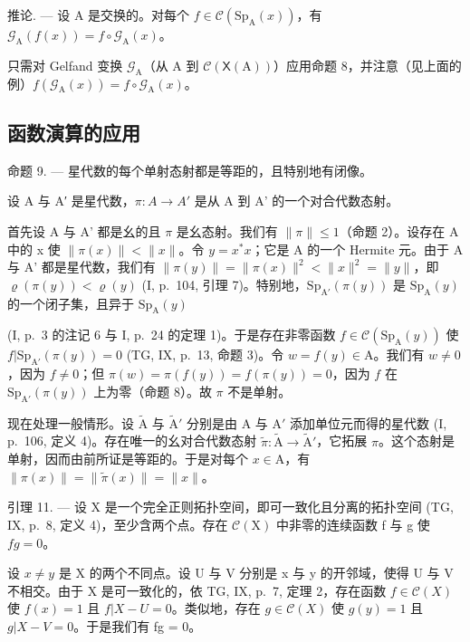 推论. --- 设 A 是交换的。对每个 \(f \in \mathcal{C}(\mathrm{Sp}_{\mathrm{A}}(x))\)，有 \(\mathcal{G}_{\mathrm{A}}(f(x)) = f \circ \mathcal{G}_{\mathrm{A}}(x)\)。

只需对 Gelfand 变换 \(\mathcal{G}_{\mathrm{A}}\)（从 A 到 \(\mathcal{C}(\mathsf{X}(\mathrm{A}))\)）应用命题 8，并注意（见上面的例）\(f(\mathcal{G}_{\mathrm{A}}(x)) = f \circ \mathcal{G}_{\mathrm{A}}(x)\)。

\subsection{函数演算的应用}

命题 9. --- 星代数的每个单射态射都是等距的，且特别地有闭像。

设 A 与 A′ 是星代数，\(\pi\colon A\to A'\) 是从 A 到 A' 的一个对合代数态射。

首先设 A 与 A' 都是幺的且 \(\pi\) 是幺态射。我们有 \(\|\pi\| \leqslant 1\)（命题 2）。设存在 A 中的 x 使 \(\|\pi(x)\| < \|x\|\)。令 \(y = x^{*}x\)；它是 A 的一个 Hermite 元。由于 A 与 A' 都是星代数，我们有 \(\|\pi(y)\| = \|\pi(x)\|^{2} < \|x\|^{2} = \|y\|\)，即 \(\varrho(\pi(y)) < \varrho(y)\) (I, p.~104, 引理 7)。特别地，\(\mathrm{Sp}_{\mathrm{A}'}(\pi(y))\) 是 \(\mathrm{Sp}_{\mathrm{A}}(y)\) 的一个闭子集，且异于 \(\mathrm{Sp}_{\mathrm{A}}(y)\)

(I, p.~3 的注记 6 与 I, p.~24 的定理 1)。于是存在非零函数 \(f \in \mathcal{C}(\mathrm{Sp}_{\mathrm{A}}(y))\) 使 \(f| \mathrm{Sp}_{\mathrm{A}'}(\pi(y)) = 0\) (TG, IX, p.~13, 命题 3)。令 \(w = f(y) \in \mathrm{A}\)。我们有 \(w \neq 0\)，因为 \(f \neq 0\)；但 \(\pi(w) = \pi(f(y)) = f(\pi(y)) = 0\)，因为 \(f\) 在 \(\mathrm{Sp}_{\mathrm{A}'}(\pi(y))\) 上为零（命题 8）。故 \(\pi\) 不是单射。

现在处理一般情形。设 \(\widetilde{\mathrm{A}}\) 与 \(\widetilde{\mathrm{A}}'\) 分别是由 A 与 \(\mathrm{A}'\) 添加单位元而得的星代数 (I, p.~106, 定义 4)。存在唯一的幺对合代数态射 \(\widetilde{\pi}\colon \widetilde{\mathrm{A}}\to \widetilde{\mathrm{A}}'\)，它拓展 \(\pi\)。这个态射是单射，因而由前所证是等距的。于是对每个 \(x\in \mathrm{A}\)，有 \(\| \pi (x)\| = \| \widetilde{\pi} (x)\| = \| x\|\)。

引理 11. --- 设 X 是一个完全正则拓扑空间，即可一致化且分离的拓扑空间 (TG, IX, p.~8, 定义 4)，至少含两个点。存在 \(\mathcal{C}(\mathrm{X})\) 中非零的连续函数 f 与 g 使 \(fg = 0\)。

设 \(x \neq y\) 是 X 的两个不同点。设 U 与 V 分别是 x 与 y 的开邻域，使得 U 与 V 不相交。由于 X 是可一致化的，依 TG, IX, p.~7, 定理 2，存在函数 \(f \in \mathcal{C}(X)\) 使 \(f(x) = 1\) 且 \(f|X - U = 0\)。类似地，存在 \(g \in \mathcal{C}(X)\) 使 \(g(y) = 1\) 且 \(g|X - V = 0\)。于是我们有 fg = 0。

